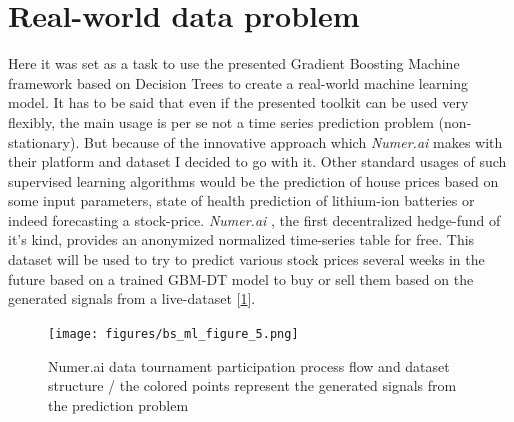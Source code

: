 \documentclass[12pt, a4paper]{article}
\begin{document}
\section{Real-world data problem}
Here it was set as a task to use the presented Gradient Boosting Machine framework based on Decision Trees to create a real-world machine learning model. It has to be said that even if the presented toolkit can be used very flexibly, the main usage is per se not a time series prediction problem (non-stationary). But because of the innovative approach which \textit{Numer.ai} makes with their platform and dataset I decided to go with it.
Other standard usages of such supervised learning algorithms would be the prediction of house prices based on some input parameters, state of health prediction of lithium-ion batteries or indeed forecasting a stock-price. \textit{Numer.ai} \cite{Numerai}, the first decentralized hedge-fund of it's kind, provides an anonymized normalized time-series table for free. This dataset will be used to try to predict various stock prices several weeks in the future based on a trained GBM-DT model to buy or sell them based on the generated signals from a live-dataset [\ref{fig: numerai_workflow}].
\begin{figure}[!htpb]
    \centering
    \texttt{[image: figures/bs\_ml\_figure\_5.png]}
    \caption[Numer.ai data tournament participation process flow and dataset structure]{Numer.ai data tournament participation process flow and dataset structure \cite{Numerai} / the colored points represent the generated signals from the prediction problem}
    \label{fig: numerai_workflow}
\end{figure}
\newpage
\end{document}
